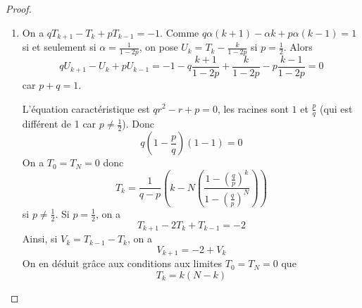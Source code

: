 \begin{proof}
\begin{enumerate}
        \item On a $qT_{k+1}-T_{k}+pT_{k-1}=-1$. Comme $q\alpha(k+1)-\alpha k+p\alpha(k-1)=1$ si et seulement si $\alpha=\frac{1}{1-2p}$, on pose $U_{k}=T_{k}-\frac{k}{1-2p}$ si $p=\frac{1}{2}$. Alors 
        \begin{equation}
            qU_{k+1}-U_{k}+pU_{k-1}=-1-q\frac{k+1}{1-2p}+\frac{k}{1-2p}-p\frac{k-1}{1-2p}=0
        \end{equation}
        car $p+q=1$.

        L'équation caractéristique est $qr^{2}-r+p=0$, les racines sont $1$ et $\frac{p}{q}$ (qui est différent de 1 car $p\neq \frac{1}{2}$). Donc 
        \begin{equation}
            q\left(1-\frac{p}{q}\right)(1-1)=0
        \end{equation}
        On a $T_{0}=T_{N}=0$ donc 
        \begin{equation}
            \boxed{T_{k}=\frac{1}{q-p}\left(k-N\left(\frac{1-\left(\frac{q}{p}\right)^{k}}{1-\left(\frac{q}{p}\right)^{N}}\right)\right)}
        \end{equation}
        si $p\neq\frac{1}{2}$. Si $p=\frac{1}{2}$, on a 
        \begin{equation}
            T_{k+1}-2T_{k}+T_{k-1}=-2    
        \end{equation}
        Ainsi, si $V_{k}=T_{k-1}-T_{k}$, on a 
        \begin{equation}
            V_{k+1}=-2+V_{k}
        \end{equation}
        On en déduit grâce aux conditions aux limites $T_{0}=T_{N}=0$ que 
        \begin{equation}
            \boxed{T_{k}=k(N-k)}
        \end{equation}
    \end{enumerate}
\end{proof}

